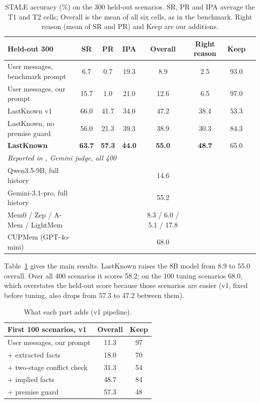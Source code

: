 \documentclass[10pt,twocolumn]{article}
\begin{document}
\begin{table}[t]
\centering
\begin{tabular}{lccccccc}
\toprule
Held-out 300 & SR & PR & IPA & \textbf{Overall} & Right reason & Keep \\
\midrule
User messages, benchmark prompt & 6.7 & 0.7 & 19.3 & 8.9 & 2.5 & 93.0 \\
User messages, our prompt & 15.7 & 1.0 & 21.0 & 12.6 & 6.5 & 97.0 \\
LastKnown v1 & 66.0 & 41.7 & 34.0 & 47.2 & 38.4 & 53.3 \\
LastKnown, no premise guard & 56.0 & 21.3 & 39.3 & 38.9 & 30.3 & 84.3 \\
\textbf{LastKnown} & \textbf{63.7} & \textbf{57.3} & \textbf{44.0} & \textbf{55.0} & \textbf{48.7} & 65.0 \\
\midrule
\multicolumn{7}{l}{\textit{Reported in \cite{stale}, Gemini judge, all 400}} \\
Qwen3.5-9B, full history & & & & 14.6 & & \\
Gemini-3.1-pro, full history & & & & 55.2 & & \\
Mem0 / Zep / A-Mem / LightMem & & & & 8.3 / 6.0 / 5.1 / 17.8 & & \\
CUPMem (GPT-4o-mini) & & & & 68.0 & & \\
\bottomrule
\end{tabular}
\caption{STALE accuracy (\%) on the 300 held-out scenarios. SR, PR and IPA average the T1 and T2 cells; Overall is the
mean of all six cells, as in the benchmark. Right reason (mean of SR and PR) and Keep are our additions.}
\label{tab:main}
\end{table}

Table~\ref{tab:main} gives the main results. LastKnown raises the 8B model from 8.9 to 55.0 overall. Over all 400
scenarios it scores 58.2; on the 100 tuning scenarios 68.0, which overstates the held-out score because those
scenarios are easier (v1, fixed before tuning, also drops from 57.3 to 47.2 between them).

\begin{table}[t]
\centering
\begin{tabular}{lcc}
\toprule
First 100 scenarios, v1 & Overall & Keep \\
\midrule
User messages, our prompt & 11.3 & 97 \\
+ extracted facts & 18.0 & 70 \\
+ two-stage conflict check & 31.3 & 54 \\
+ implied facts & 48.7 & 84 \\
+ premise guard & 57.3 & 48 \\
\bottomrule
\end{tabular}
\caption{What each part adds (v1 pipeline).}
\label{tab:ablation}
\end{table}
\end{document}
